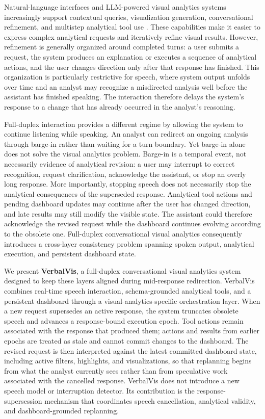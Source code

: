 \documentclass[journal]{IEEEtran}
\begin{document}
Natural-language interfaces and LLM-powered visual analytics systems
increasingly support contextual queries, visualization generation,
conversational refinement, and multistep analytical tool use
\cite{gao2015datatone,setlur2016eviza,narechania2021nl4dv,
dibia2023lida,wang2024dataformulator2,zhao2024lightva}. These capabilities make
it easier to express complex analytical requests and iteratively refine visual
results. However, refinement is generally organized around completed turns: a
user submits a request, the system produces an explanation or executes a
sequence of analytical actions, and the user changes direction only after that
response has finished. This organization is particularly restrictive for
speech, where system output unfolds over time and an analyst may recognize a
misdirected analysis well before the assistant has finished speaking. The
interaction therefore delays the system's response to a change that has already
occurred in the analyst's reasoning.

Full-duplex interaction provides a different regime by allowing the system to
continue listening while speaking. An analyst can redirect an ongoing analysis
through barge-in rather than waiting for a turn boundary. Yet barge-in alone
does not solve the visual analytics problem. Barge-in is a temporal event, not
necessarily evidence of analytical revision: a user may interrupt to correct
recognition, request clarification, acknowledge the assistant, or stop an
overly long response. More importantly, stopping speech does not necessarily
stop the analytical consequences of the superseded response. Analytical tool
actions and pending dashboard updates may continue after the user has changed
direction, and late results may still modify the visible state. The assistant
could therefore acknowledge the revised request while the dashboard continues
evolving according to the obsolete one. Full-duplex conversational visual
analytics consequently introduces a cross-layer consistency problem spanning
spoken output, analytical execution, and persistent dashboard state.

We present \textbf{VerbalVis}, a full-duplex conversational visual analytics
system designed to keep these layers aligned during mid-response redirection.
VerbalVis combines real-time speech interaction, schema-grounded analytical
tools, and a persistent dashboard through a visual-analytics-specific
orchestration layer. When a new request supersedes an active response, the
system truncates obsolete speech and advances a response-bound execution epoch.
Tool actions remain associated with the response that produced them; actions
and results from earlier epochs are treated as stale and cannot commit changes
to the dashboard. The revised request is then interpreted against the latest
committed dashboard state, including active filters, highlights, and
visualizations, so that replanning begins from what the analyst currently sees
rather than from speculative work associated with the cancelled response.
VerbalVis does not introduce a new speech model or interruption detector. Its
contribution is the response-supersession mechanism that coordinates speech
cancellation, analytical validity, and dashboard-grounded replanning.
\end{document}
